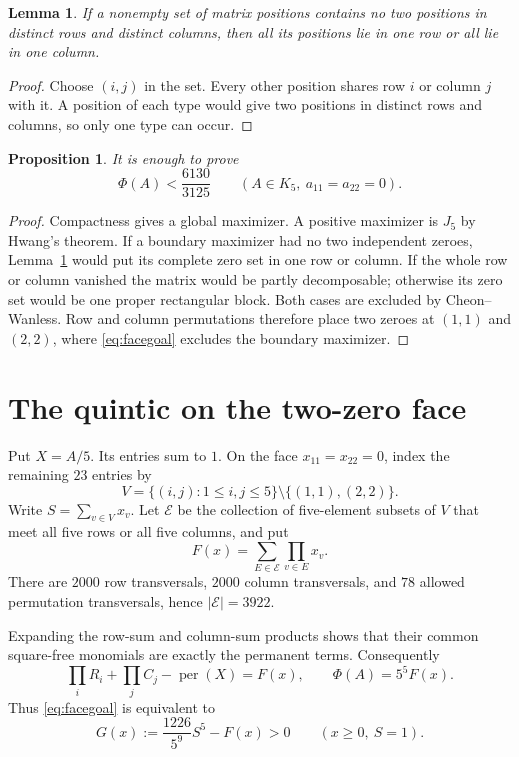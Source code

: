 \documentclass[11pt]{article}
\newtheorem{proposition}[theorem]{Proposition}
\newtheorem{lemma}[theorem]{Lemma}
\newcommand{\permanent}{\operatorname{per}}
\begin{document}
\begin{lemma}\label{lem:zeros}
If a nonempty set of matrix positions contains no two positions in distinct
rows and distinct columns, then all its positions lie in one row or all lie
in one column.
\end{lemma}

\begin{proof}
Choose $(i,j)$ in the set.  Every other position shares row $i$ or column $j$
with it.  A position of each type would give two positions in distinct rows
and columns, so only one type can occur.
\end{proof}

\begin{proposition}\label{prop:reduction}
It is enough to prove
\[
 \Phi(A)<\frac{6130}{3125}
 \qquad(A\in K_5,\ a_{11}=a_{22}=0).
 \tag{1}\label{eq:facegoal}
\]
\end{proposition}

\begin{proof}
Compactness gives a global maximizer.  A positive maximizer is $J_5$ by
Hwang's theorem.  If a boundary maximizer had no two independent zeroes,
Lemma~\ref{lem:zeros} would put its complete zero set in one row or column.
If the whole row or column vanished the matrix would be partly decomposable;
otherwise its zero set would be one proper rectangular block.  Both cases are
excluded by Cheon--Wanless.  Row and column permutations therefore place two
zeroes at $(1,1)$ and $(2,2)$, where \eqref{eq:facegoal} excludes the boundary
maximizer.
\end{proof}

\section{The quintic on the two-zero face}
Put $X=A/5$.  Its entries sum to $1$.  On the face $x_{11}=x_{22}=0$, index
the remaining $23$ entries by
\[
 V=\{(i,j):1\le i,j\le5\}\setminus\{(1,1),(2,2)\}.
\]
Write $S=\sum_{v\in V}x_v$.  Let $\mathcal E$ be the collection of
five-element subsets of $V$ that meet all five rows or all five columns, and
put
\[
 F(x)=\sum_{E\in\mathcal E}\prod_{v\in E}x_v.
 \tag{2}
\]
There are $2000$ row transversals, $2000$ column transversals, and $78$
allowed permutation transversals, hence $|\mathcal E|=3922$.

Expanding the row-sum and column-sum products shows that their common
square-free monomials are exactly the permanent terms.  Consequently
\[
 \prod_i R_i+\prod_j C_j-\permanent(X)=F(x),
 \qquad \Phi(A)=5^5F(x).
 \tag{3}
\]
Thus \eqref{eq:facegoal} is equivalent to
\[
 G(x):=\frac{1226}{5^9}S^5-F(x)>0
 \qquad(x\ge0,\ S=1).
 \tag{4}\label{eq:G}
\]
\end{document}
